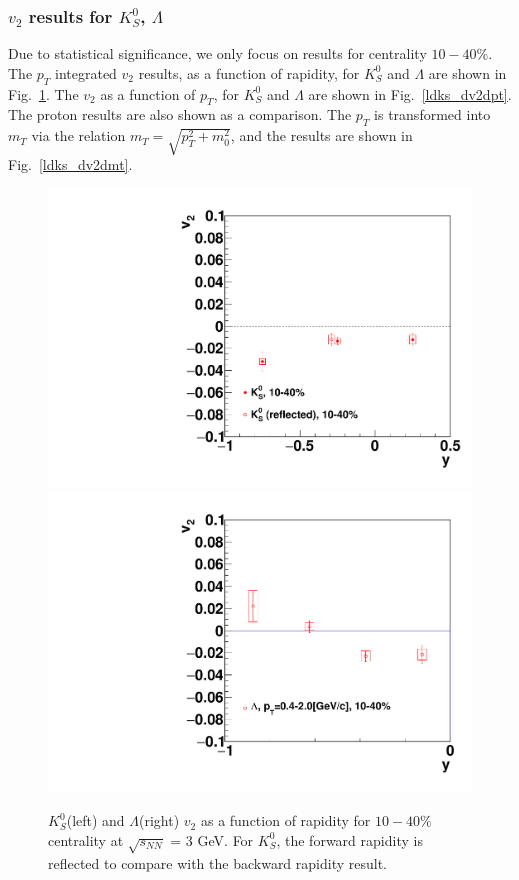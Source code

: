 \subsubsection{$v_2$ results for $K^0_S$, $\Lambda$}

Due to statistical significance, we only focus on results for centrality $10-40\%$.
The $p_{T}$ integrated $v_2$ results, as a function of rapidity, for $K^0_S$ and $\Lambda$ are shown in 
Fig.~\ref{kskd_v2}. The $v_2$  as a function of $p_{T}$, for $K^0_S$ and $\Lambda$ are shown in Fig.~\ref{ldks_dv2dpt}. The proton results are also shown as a comparison. The $p_{T}$ is transformed into $m_{T}$ via the relation $m_{T}=\sqrt{p_{T}^{2}+m_{0}^{2}}$, and the results are shown in Fig.~\ref{ldks_dv2dmt}.



\begin{figure}[h]
\includegraphics[width=0.49\linewidth]{chapterX/fig/ks_sys_v2.pdf}
\includegraphics[width=0.49\linewidth]{chapterX/fig/ld_sys_v2.pdf}
\caption{$K^0_S$(left) and $\Lambda$(right) $v_2$ as a function of rapidity for $10-40\%$ centrality at $\sqrt{s_{NN}}$ = 3 GeV. For $K^0_S$, the forward rapidity is reflected to compare with the backward rapidity result.}
\label{kskd_v2}
\end{figure}



